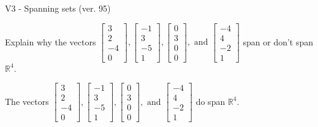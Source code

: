 \begin{exercise}
  \begin{exerciseTitle}V3 - Spanning sets (ver. 95)\end{exerciseTitle}
  \begin{exerciseStatement}
    Explain why the vectors \(\left[\begin{array}{r}
3 \\
2 \\
-4 \\
0
\end{array}\right] , \left[\begin{array}{r}
-1 \\
3 \\
-5 \\
1
\end{array}\right] , \left[\begin{array}{r}
0 \\
3 \\
0 \\
0
\end{array}\right] , \text{ and } \left[\begin{array}{r}
-4 \\
4 \\
-2 \\
1
\end{array}\right]\) span or don't span \(\mathbb{R}^4\). 
	


  \end{exerciseStatement}
  \begin{exerciseAnswer}
   The vectors \(\left[\begin{array}{r}
3 \\
2 \\
-4 \\
0
\end{array}\right] , \left[\begin{array}{r}
-1 \\
3 \\
-5 \\
1
\end{array}\right] , \left[\begin{array}{r}
0 \\
3 \\
0 \\
0
\end{array}\right] , \text{ and } \left[\begin{array}{r}
-4 \\
4 \\
-2 \\
1
\end{array}\right]\) 
  	 do  
	span \(\mathbb{R}^4\).
  


  \end{exerciseAnswer}
\end{exercise}
